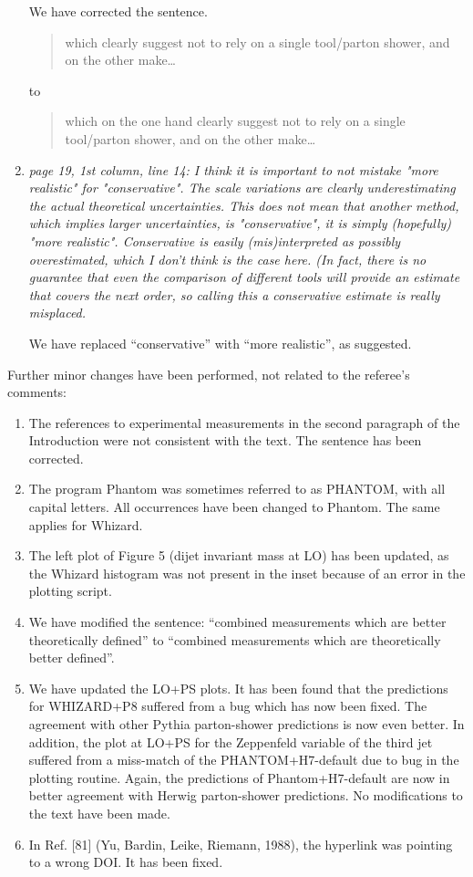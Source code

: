 \documentclass{report}
\begin{document}
\begin{enumerate}
We have corrected the sentence.
\begin{quote}
which clearly suggest not to rely on a single tool/parton shower, and on the other make\ldots
\end{quote}
to
\begin{quote}
which on the one hand clearly suggest not to rely on a single tool/parton shower, and on the other make\ldots
\end{quote}
    
\item \emph{page 19, 1st column, line 14:
I think it is important to not mistake "more realistic" for "conservative". The
scale variations are clearly underestimating the actual theoretical uncertainties.
This does not mean that another method, which implies larger uncertainties, is "conservative", it is simply (hopefully) "more realistic".
Conservative is easily (mis)interpreted as possibly overestimated, which I don't think is the case here.
(In fact, there is no guarantee that even the comparison of different tools will provide an estimate that covers the next order, so calling this a conservative estimate is really misplaced.}

We have replaced ``conservative'' with ``more realistic'', as suggested.

\end{enumerate}
\vspace{1cm}
Further minor changes have been performed, not related to the referee's comments:
\begin{enumerate}
\item The references to experimental measurements in the second paragraph of the Introduction were not consistent
    with the text. The sentence has been corrected.
\item The program {\sc Phantom} was sometimes referred to as {\sc PHANTOM}, with all capital letters. All occurrences
    have been changed to {\sc Phantom}. The same applies for {\sc Whizard}.
\item The left plot of Figure 5 (dijet invariant mass at LO) 
    has been updated, as the {\sc Whizard} histogram was not present
    in the inset because of an error in the plotting script.
\item We have modified the sentence:
``combined measurements which are better theoretically defined'' to ``combined measurements which are theoretically better defined''.
\item We have updated the LO+PS plots.
It has been found that the predictions for WHIZARD+P8 suffered from a bug which has now been fixed.
The agreement with other Pythia parton-shower predictions is now even better.
In addition, the plot at LO+PS for the Zeppenfeld variable of the third jet suffered from a miss-match of the PHANTOM+H7-default due to bug in the plotting routine.
Again, the predictions of Phantom+H7-default are now in better agreement with Herwig parton-shower predictions.
No modifications to the text have been made.
\item In Ref. [81] (Yu, Bardin, Leike, Riemann, 1988), the hyperlink was pointing to a wrong DOI. It has been fixed.
\end{enumerate}
\end{document}

